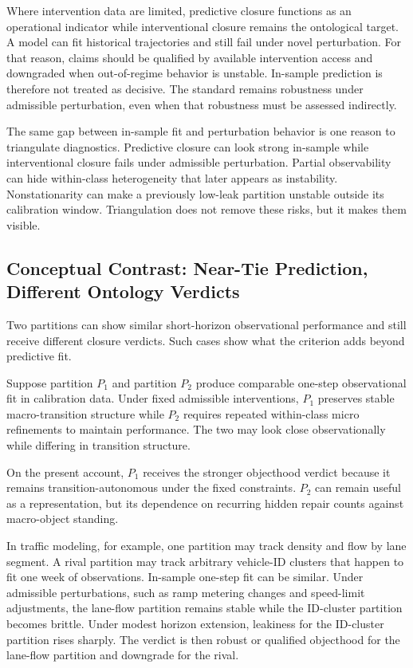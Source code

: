 Where intervention data are limited, predictive closure functions as an
operational indicator while interventional closure remains the
ontological target. A model can fit historical trajectories and still
fail under novel perturbation. For that reason, claims should be
qualified by available intervention access and downgraded when
out-of-regime behavior is unstable. In-sample prediction is therefore
not treated as decisive. The standard remains robustness under
admissible perturbation, even when that robustness must be assessed
indirectly.

The same gap between in-sample fit and perturbation behavior is one
reason to triangulate diagnostics. Predictive closure can look strong
in-sample while interventional closure fails under admissible
perturbation. Partial observability can hide within-class heterogeneity
that later appears as instability. Nonstationarity can make a previously
low-leak partition unstable outside its calibration window.
Triangulation does not remove these risks, but it makes them visible.

\subsection{Conceptual Contrast: Near-Tie Prediction, Different
	Ontology
	Verdicts}\label{conceptual-contrast-near-tie-prediction-different-ontology-verdicts}

Two partitions can show similar short-horizon observational performance
and still receive different closure verdicts. Such cases show what the
criterion adds beyond predictive fit.

Suppose partition \(P_1\) and partition \(P_2\) produce comparable
one-step observational fit in calibration data. Under fixed admissible
interventions, \(P_1\) preserves stable macro-transition structure while
\(P_2\) requires repeated within-class micro refinements to maintain
performance. The two may look close observationally while differing in
transition structure.

On the present account, \(P_1\) receives the stronger objecthood
verdict because it remains transition-autonomous under the fixed
constraints. \(P_2\) can remain useful as a representation, but its
dependence on recurring hidden repair counts against macro-object
standing.

In traffic modeling, for example, one partition may track density and
flow by lane segment. A rival partition may track arbitrary vehicle-ID
clusters that happen to fit one week of observations. In-sample one-step
fit can be similar. Under admissible perturbations, such as ramp
metering changes and speed-limit adjustments, the lane-flow partition
remains stable while the ID-cluster partition becomes brittle. Under
modest horizon extension, leakiness for the ID-cluster partition rises
sharply. The verdict is then robust or qualified objecthood for the
lane-flow partition and downgrade for the rival.

